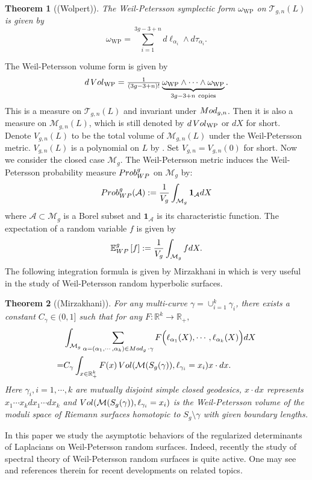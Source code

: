 \documentclass[11pt]{amsart}
\newcommand{\calT}{\mathcal{T}}
\newcommand{\T}{\calT}
\newcommand{\M}{\mathcal{M}}
\newcommand{\sM}{\mathcal{M}}
\newcommand{\sbs}{\subset}
\newcommand{\E}{\mathbb{E}_{\rm WP}^g}
\def\Vol{\mathop{\rm Vol}}
\def\Prob{\mathop{\rm Prob}\nolimits_{\rm WP}^g}
\def\Mod{\mathop{\rm Mod}}
\theoremstyle{plain}
\newtheorem{theorem}{Theorem}
\theoremstyle{definition}
\theoremstyle{remark}
\begin{document}
\begin{theorem}[(Wolpert)]\label{thm Wolpert}
	The Weil-Petersson symplectic form $\omega_{\mathrm{WP}}$ on $\T_{g,n}(L)$ is given by 
	$$\omega_{\mathrm{WP}} = \sum_{i=1}^{3g-3+n} d\ell_{\alpha_i} \wedge d\tau_{\alpha_i}.$$
\end{theorem}
The Weil-Petersson volume form is given by 
$$d\Vol\nolimits_{\mathrm{WP}}=\tfrac{1}{(3g-3+n)!}\underbrace{\omega_{\mathrm{WP}}\wedge\cdots\wedge\omega_{\mathrm{WP}}}_{3g-3+n\ \text{copies}}.$$
This is a measure on $\T_{g,n}(L)$ and invariant under $\Mod_{g,n}$. Then it is also a measure on $\M_{g,n}(L)$, which is still denoted by $d\Vol_{\mathrm{WP}}$ or $dX$ for short. Denote $V_{g,n}(L)$ to be the total volume of $\M_{g,n}(L)$ under the Weil-Petersson metric. $V_{g,n}(L)$ is a polynomial on $L$  by \cite{Mirz07}. Set $V_{g,n}=V_{g,n}(0)$ for short. Now we consider the closed case $\sM_g$.  The Weil-Petersson metric induces the Weil-Petersson probability measure $\Prob$ on $\M_g$ by:
$$\Prob(\mathcal{A}):=\frac{1}{V_{g}}\int_{\M_{g}} \mathbf{1}_{\mathcal{A}} dX$$
where $\mathcal{A}\sbs\M_g$ is a Borel subset and $\mathbf{1}_{\mathcal{A}}$ is its characteristic function. The  expectation  of  a random variable
$f$ is given by $$
\E\left[ f\right]:=\frac{1}{V_g}\int_{\M_g}fdX.
$$
The following integration formula is given by Mirzakhani in \cite{mirzakhani2013growth} which is very useful in the study of Weil-Petersson random hyperbolic surfaces.
\begin{theorem}[(Mirzakhani)]\label{MIF}
    For any multi-curve $\gamma=\cup_{i=1}^k\gamma_i$, there  exists a constant $C_\gamma\in(0,1]$ such that for
 any $F:\mathbb{R}^k\to \mathbb{R}_+,$   $$\begin{aligned}
     &\int_{\sM_{g}}\sum_{\alpha=(\alpha_1,\cdots,\alpha_k)\in\Mod_{g}\cdot \gamma}F\Big(\ell_{\alpha_1}(X),\cdots,\ell_{\alpha_k}(X)\Big)dX\\
=&C_\gamma\int_{x\in\mathbb{R}_+^k}F(x)\Vol(\sM(S_{g}(\gamma)),\ell_{\gamma_i}=x_i)x\cdot dx. \end{aligned}
 $$
Here  $\gamma_i,i=1,\cdots,k$ are mutually disjoint simple closed geodesics,  $x\cdot dx$ represents $x_1\cdots x_kdx_1\cdots dx_k$ and $\Vol(
\sM(S_{g}(\gamma)),\ell_{\gamma_i}=x_i)
$  is the Weil-Petersson volume of the moduli space of Riemann surfaces homotopic to $S_g\setminus \gamma$ with given boundary lengths.
\end{theorem}

\noindent In this paper we study the asymptotic behaviors of the regularized determinants of Laplacians on Weil-Petersson random surfaces. Indeed,
recently the study of spectral theory of Weil-Petersson random surfaces is quite active. One may see \cite{mirzakhani2013growth, MS20, GMST21, Monk22, wu2022random, LW21, AM23, Hide21, Rud22, RW22, WX22pgt, SW22, HT22, naud2023determinants, Gong23, MS23} and references therein for recent developments on related topics. 
\end{document}
